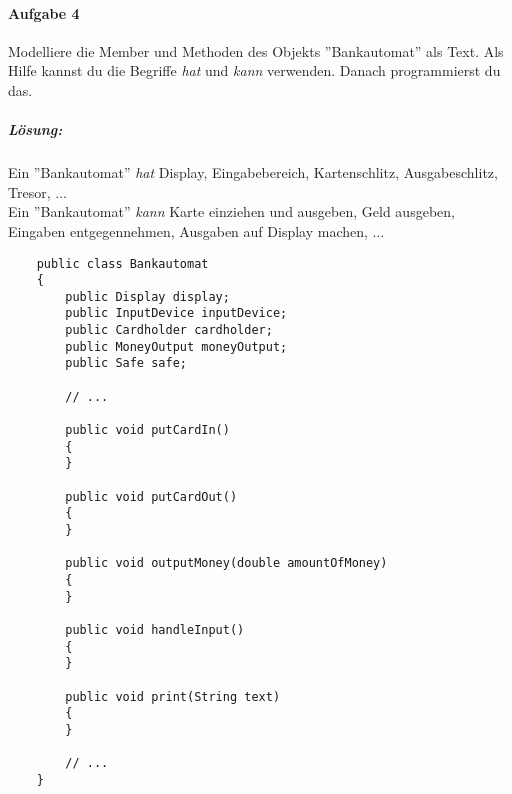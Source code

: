\documentclass[12pt,a4paper,ngerman]{scrartcl}
\begin{document}
	\paragraph{Aufgabe 4}\mbox{}
	Modelliere die Member und Methoden des Objekts ''Bankautomat'' als Text. Als Hilfe kannst du die Begriffe \emph{hat} und \emph{kann} verwenden. Danach programmierst du das.

	\subparagraph{Lösung:}
	Ein ''Bankautomat'' \emph{hat} Display, Eingabebereich, Kartenschlitz, Ausgabeschlitz, Tresor, $\dots$\\
	Ein ''Bankautomat'' \emph{kann} Karte einziehen und ausgeben, Geld ausgeben, Eingaben entgegennehmen, Ausgaben auf Display machen, $\dots$
	\begin{lstlisting}
	public class Bankautomat
	{
		public Display display;
		public InputDevice inputDevice;
		public Cardholder cardholder;
		public MoneyOutput moneyOutput;
		public Safe safe;
		
		// ...
		
		public void putCardIn()
		{
		}
		
		public void putCardOut()
		{
		}
		
		public void outputMoney(double amountOfMoney)
		{
		}
		
		public void handleInput()
		{
		}
		
		public void print(String text)
		{
		}
		
		// ...
	}
	\end{lstlisting}
\end{document}
